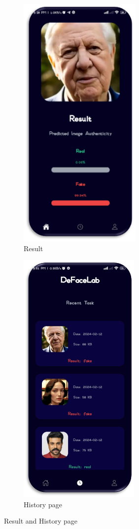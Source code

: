 \begin{figure}[ht]
    \centering
    \begin{subfigure}[b]{0.45\textwidth}
        \centering
        \includegraphics[height=5in]{img/Results.png}
        \caption{{Result}}
    \end{subfigure}
    \hfill
    \begin{subfigure}[b]{0.45\textwidth}
        \centering
        \includegraphics[height=5in]{img/Historyv2.png}
        \caption{{History page}}
    \end{subfigure}
    \caption{Result and History page}
\end{figure}

